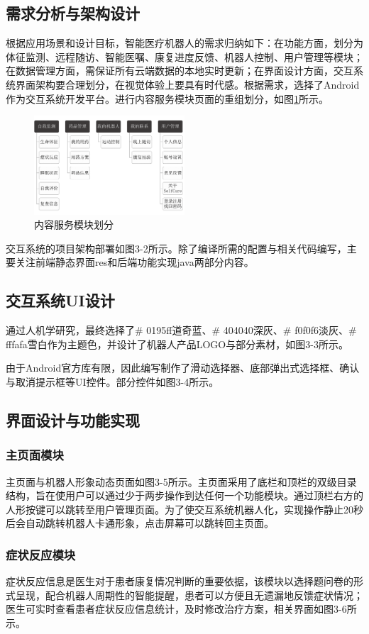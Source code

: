 \documentclass[UTF8]{XJTUthesis}
\begin{document}
\subsection{需求分析与架构设计}
根据应用场景和设计目标，智能医疗机器人的需求归纳如下：在功能方面，划分为体征监测、远程随访、智能医嘱、康复进度反馈、机器人控制、用户管理等模块；在数据管理方面，需保证所有云端数据的本地实时更新；在界面设计方面，交互系统界面架构要合理划分，在视觉体验上要具有时代感。根据需求，选择了Android作为交互系统开发平台。进行内容服务模块页面的重组划分，如图\ref{module}所示。
\begin{figure}[htbp]
  \centering
  \includegraphics[width=0.5\textwidth]{example//module.png}
  \caption{内容服务模块划分}\label{module}
\end{figure}
交互系统的项目架构部署如图3-2所示。除了编译所需的配置与相关代码编写，主要关注前端静态界面res和后端功能实现java两部分内容。\par
\subsection{交互系统UI设计}
通过人机学研究，最终选择了\# 0195ff道奇蓝、\# 404040深灰、\# f0f0f6淡灰、\# fffafa雪白作为主题色，并设计了机器人产品LOGO与部分素材，如图3-3所示。\par
由于Android官方库有限，因此编写制作了滑动选择器、底部弹出式选择框、确认与取消提示框等UI控件。部分控件如图3-4所示。

\subsection{界面设计与功能实现}
\subsubsection{主页面模块}
主页面与机器人形象动态页面如图3-5所示。主页面采用了底栏和顶栏的双级目录结构，旨在使用户可以通过少于两步操作到达任何一个功能模块。通过顶栏右方的人形按键可以跳转至用户管理页面。为了使交互系统机器人化，实现操作静止20秒后会自动跳转机器人卡通形象，点击屏幕可以跳转回主页面。
\subsubsection{症状反应模块}
症状反应信息是医生对于患者康复情况判断的重要依据，该模块以选择题问卷的形式呈现，配合机器人周期性的智能提醒，患者可以方便且无遗漏地反馈症状情况；医生可实时查看患者症状反应信息统计，及时修改治疗方案，相关界面如图3-6所示。
\end{document}
